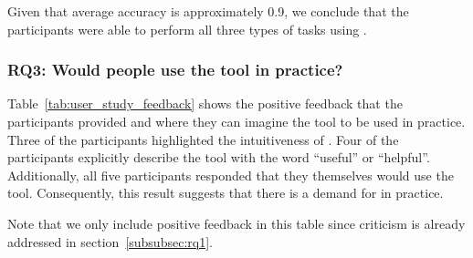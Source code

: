Given that average accuracy is approximately 0.9, we conclude that the participants were able to perform all three types of tasks using \toolname{}.

\subsubsection{\textbf{RQ3:} Would people use the tool in practice?} %
Table~\ref{tab:user_study_feedback} shows the positive feedback that the participants provided and where they can imagine the tool to be used in practice.
Three of the participants highlighted the intuitiveness of \toolname.
Four of the participants explicitly describe the tool with the word ``useful'' or ``helpful''.
Additionally, all five participants responded that they themselves would use the tool.
Consequently, this result suggests that there is a demand for \toolname{} in practice.

Note that we only include positive feedback in this table since criticism is already addressed in section~\ref{subsubsec:rq1}.



